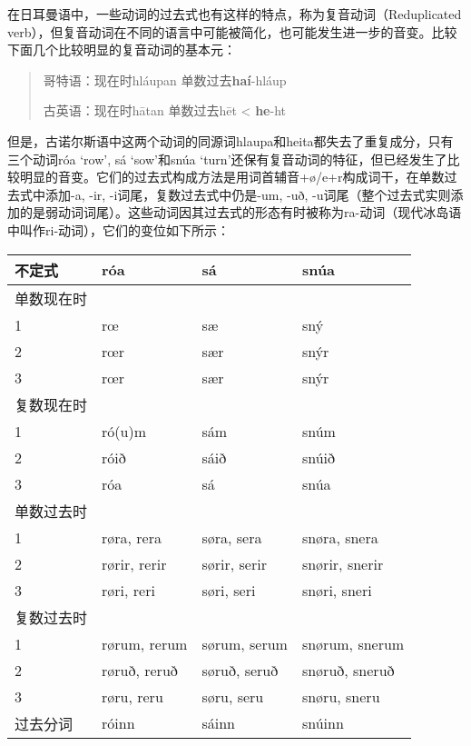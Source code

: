 在日耳曼语中，一些动词的过去式也有这样的特点，称为复音动词（Reduplicated
verb），但复音动词在不同的语言中可能被简化，也可能发生进一步的音变。比较下面几个比较明显的复音动词的基本元：

\begin{quote}
  哥特语：现在时hláupan 单数过去\textbf{haí}-hláup

  古英语：现在时hātan 单数过去hēt \textless{} \textbf{he}-ht
\end{quote}

但是，古诺尔斯语中这两个动词的同源词hlaupa和heita都失去了重复成分，只有三个动词róa
`row‌', sá `sow‌'和snúa
`turn‌'还保有复音动词的特征，但已经发生了比较明显的音变。它们的过去式构成方法是用词首辅音+ø/e+r构成词干，在单数过去式中添加-a,
-ir, -i词尾，复数过去式中仍是-um, -uð,
-u词尾（整个过去式实则添加的是弱动词词尾）。这些动词因其过去式的形态有时被称为ra-动词（现代冰岛语中叫作ri-动词），它们的变位如下所示：

\begin{longtable}{llll}
  \toprule
  不定式     & róa          & sá           & snúa           \\
  \midrule
  \endhead
  \bottomrule
  \endfoot
  单数现在时 &              &              &                \\
  1          & rœ           & sæ           & sný            \\
  2          & rœr          & sær          & snýr           \\
  3          & rœr          & sær          & snýr           \\
  复数现在时 &              &              &                \\
  1          & ró(u)m       & sám          & snúm           \\
  2          & róið         & sáið         & snúið          \\
  3          & róa          & sá           & snúa           \\
  单数过去时 &              &              &                \\
  1          & røra, rera   & søra, sera   & snøra, snera   \\
  2          & rørir, rerir & sørir, serir & snørir, snerir \\
  3          & røri, reri   & søri, seri   & snøri, sneri   \\
  复数过去时 &              &              &                \\
  1          & rørum, rerum & sørum, serum & snørum, snerum \\
  2          & røruð, reruð & søruð, seruð & snøruð, sneruð \\
  3          & røru, reru   & søru, seru   & snøru, sneru   \\
  过去分词   & róinn        & sáinn        & snúinn         \\
\end{longtable}


